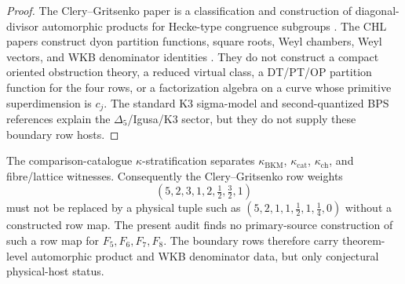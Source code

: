 \begin{proof}
The Clery--Gritsenko paper is a classification and construction of
diagonal-divisor automorphic products for Hecke-type congruence subgroups
\cite{GC}.  The CHL papers construct dyon partition functions, square roots,
Weyl chambers, Weyl vectors, and WKB denominator identities
\cite{CD09BKM,GK09CHL,GK10Composite,Gov11BKM}.  They do not construct a
compact oriented obstruction theory, a reduced virtual class, a DT/PT/OP
partition function for the four rows, or a factorization algebra on a curve
whose primitive superdimension is \(c_j\).  The standard K3 sigma-model
and second-quantized BPS references \cite{DMVV,DVV,HM} explain the
\(\Delta_5\)/Igusa/K3 sector, but they do not supply these boundary
row hosts.
\end{proof}

\begin{remark}
\label{rem:chl-boundary-voliii-compatibility}
The comparison-catalogue \(\kappa\)-stratification separates
\(\kappa_{\mathrm{BKM}}\), \(\kappa_{\mathrm{cat}}\),
\(\kappa_{\mathrm{ch}}\), and fibre/lattice witnesses.  Consequently the
Clery--Gritsenko row weights
\[
(5,2,3,1,2,\tfrac12,\tfrac32,1)
\]
must not be replaced by a physical tuple such as
\((5,2,1,1,\tfrac12,1,\tfrac14,0)\) without a constructed row map.  The
present audit finds no primary-source construction of such a row map for
\(F_5,F_6,F_7,F_8\).  The boundary rows therefore carry theorem-level
automorphic product and WKB denominator data, but only conjectural
physical-host status.
\end{remark}

